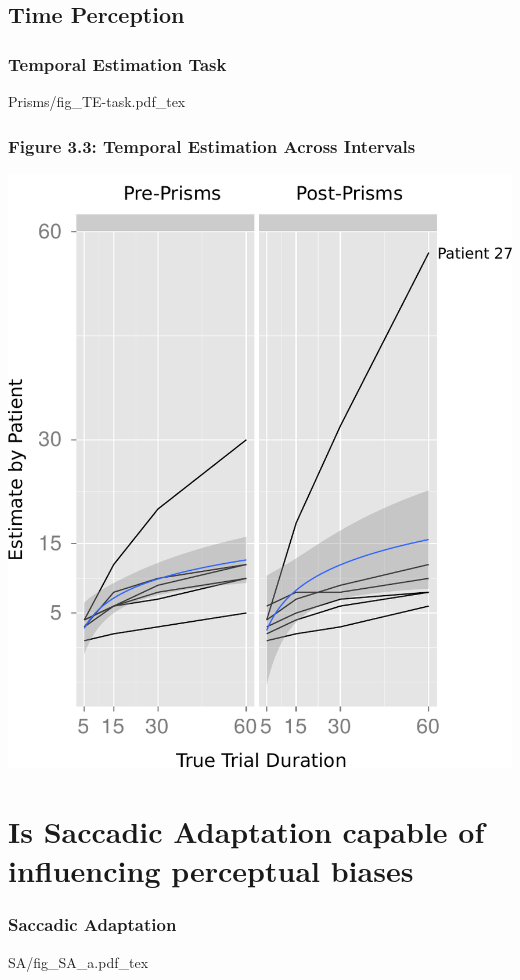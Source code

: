 \documentclass{beamer}
\begin{document}
\subsection*{Time Perception}
\begin{frame}
	\frametitle{Temporal Estimation Task}
	\def\svgwidth{0.9\textwidth}
	{Prisms/fig_TE-task.pdf_tex}
\end{frame}


\section[Saccadic Adaptation]{Is Saccadic Adaptation capable of influencing perceptual biases\?}


\begin{frame}
	\frametitle{Saccadic Adaptation}
	\centering
	\def\svgwidth{0.7\textwidth}
	\tiny
	{SA/fig_SA_a.pdf_tex}
\end{frame}
\end{document}
